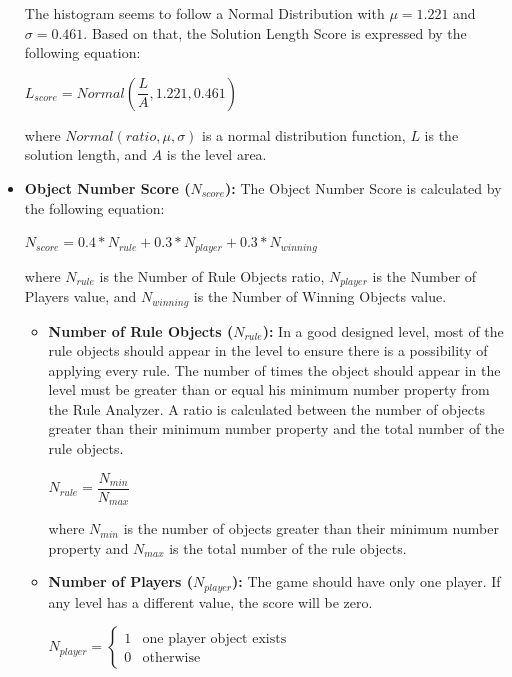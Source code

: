\begin{itemize}
	
	The histogram seems to follow a Normal Distribution with $\mu = 1.221$ and $\sigma = 0.461$. Based on that, the Solution Length Score is expressed by the following equation:
	\begin{center}$L_{score} = Normal(\dfrac{L}{A}, 1.221, 0.461)$\end{center}
	where $Normal(ratio, \mu, \sigma)$ is a normal distribution function, $L$ is the solution length, and $A$ is the level area.
	
	\item \textbf{Object Number Score ($N_{score}$):} The Object Number Score is calculated by the following equation:
	\begin{center}$N_{score} = 0.4 * N_{rule} + 0.3 * N_{player} + 0.3 * N_{winning}$\end{center}
	where $N_{rule}$ is the Number of Rule Objects ratio, $N_{player}$ is the Number of Players value, and $N_{winning}$ is the Number of Winning Objects value.
	\begin{itemize}
		\item \textbf{Number of Rule Objects ($N_{rule}$):} In a good designed level, most of the rule objects should appear in the level to ensure there is a possibility of applying every rule. The number of times the object should appear in the level must be greater than or equal his minimum number property from the Rule Analyzer. A ratio is calculated between the number of objects greater than their minimum number property and the total number of the rule objects.
		\begin{center}$N_{rule} = \dfrac{N_{min}}{N_{max}}$\end{center}
		where $N_{min}$ is the number of objects greater than their minimum number property and $N_{max}$ is the total number of the rule objects.
		\item \textbf{Number of Players ($N_{player}$):} The game should have only one player. If any level has a different value, the score will be zero.
		\begin{center}
		$N_{player}= \begin{cases}
		               1 & \text{one player object exists}\\
		               0 & \text{otherwise}
		           \end{cases}$
		\end{center}

\end{itemize}
\end{itemize}
